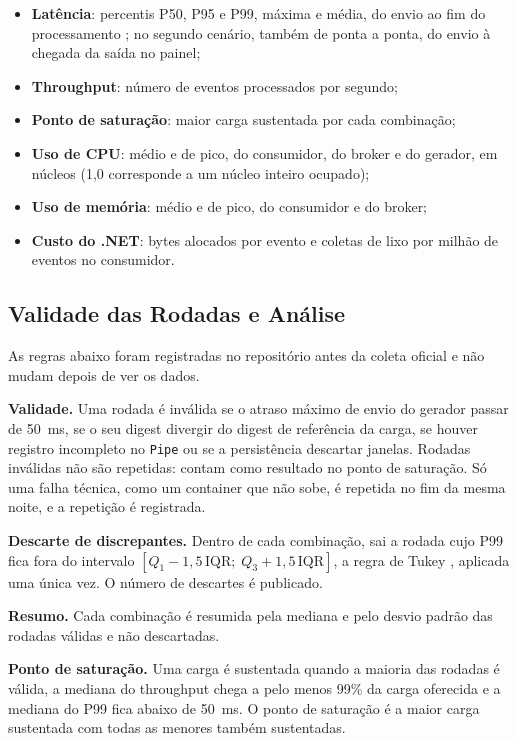 \documentclass[12pt]{article}
\begin{document}
\begin{itemize}
  \item \textbf{Latência}: percentis P50, P95 e P99, máxima e média, do envio ao fim do
        processamento \cite{fu:2021}; no segundo cenário, também de ponta a ponta, do
        envio à chegada da saída no painel;
  \item \textbf{Throughput}: número de eventos processados por segundo;
  \item \textbf{Ponto de saturação}: maior carga sustentada por cada combinação;
  \item \textbf{Uso de CPU}: médio e de pico, do consumidor, do broker e do gerador, em
        núcleos (1,0 corresponde a um núcleo inteiro ocupado);
  \item \textbf{Uso de memória}: médio e de pico, do consumidor e do broker;
  \item \textbf{Custo do .NET}: bytes alocados por evento e coletas de lixo por milhão
        de eventos no consumidor.
\end{itemize}

\subsection{Validade das Rodadas e Análise}
\label{sec:analise}

As regras abaixo foram registradas no repositório antes da coleta oficial e não mudam
depois de ver os dados.

\textbf{Validade.} Uma rodada é inválida se o atraso máximo de envio do gerador passar de
50~ms, se o seu digest divergir do digest de referência da carga, se houver registro
incompleto no \texttt{Pipe} ou se a persistência descartar janelas. Rodadas inválidas
não são repetidas: contam como resultado no ponto de saturação. Só uma falha técnica,
como um container que não sobe, é repetida no fim da mesma noite, e a repetição é
registrada.

\textbf{Descarte de discrepantes.} Dentro de cada combinação, sai a rodada cujo P99 fica
fora do intervalo $[Q_1 - 1{,}5\,\mathrm{IQR};\; Q_3 + 1{,}5\,\mathrm{IQR}]$, a regra de
Tukey \cite{tukey:1977}, aplicada uma única vez. O número de descartes é publicado.

\textbf{Resumo.} Cada combinação é resumida pela mediana e pelo desvio padrão das rodadas
válidas e não descartadas.

\textbf{Ponto de saturação.} Uma carga é sustentada quando a maioria das rodadas é válida,
a mediana do throughput chega a pelo menos 99\% da carga oferecida e a mediana do P99 fica
abaixo de 50~ms. O ponto de saturação é a maior carga sustentada com todas as menores
também sustentadas.
\end{document}

